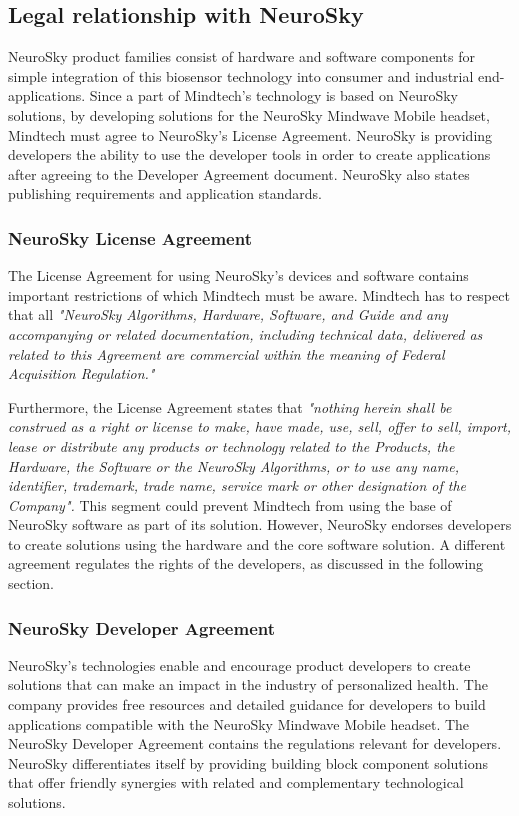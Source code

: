 \documentclass[letterpaper,10pt]{article}
\let\oldsubsection\subsection
\renewcommand{\subsection}{\def\cursectioning{subsection}\oldsubsection}
\begin{document}
\subsection{Legal relationship with NeuroSky}
NeuroSky product families consist of hardware and software components for simple integration of this biosensor technology into consumer and industrial end-applications.
Since a part of Mindtech's technology is based on NeuroSky solutions, by developing solutions for the NeuroSky Mindwave Mobile headset, Mindtech must agree to NeuroSky's License Agreement. NeuroSky is providing developers the ability to use the developer tools in order to create applications after agreeing to the Developer Agreement document. NeuroSky also states publishing requirements and application standards.

\subsubsection{NeuroSky License Agreement}

The License Agreement for using NeuroSky’s devices and software contains important restrictions of which Mindtech must be aware. Mindtech has to respect that all \textit{"NeuroSky Algorithms, Hardware, Software, and Guide and any accompanying or related documentation, including technical data, delivered as related to this Agreement are commercial within the meaning of Federal Acquisition Regulation."}

Furthermore, the License Agreement states that \textit{"nothing herein shall be construed as a right or license to make, have made, use, sell, offer to sell, import, lease or distribute any products or technology related to the Products, the Hardware, the Software or the NeuroSky Algorithms, or to use any name, identifier, trademark, trade name, service mark or other designation of the Company".} This segment could prevent Mindtech from using the base of NeuroSky software as part of its solution. However, NeuroSky endorses developers to create solutions using the hardware and the core software solution. A different agreement regulates the rights of the developers, as discussed in the following section.  \cite{neuro_licence_agreement}

\subsubsection{NeuroSky Developer Agreement}


NeuroSky’s technologies enable and encourage product developers to create solutions that can make an impact in the industry of personalized health. The company provides free resources and detailed guidance for developers to build applications compatible with the NeuroSky Mindwave Mobile headset. The NeuroSky Developer Agreement contains the regulations relevant for developers. NeuroSky differentiates itself by providing building block component solutions that offer friendly synergies with related and complementary technological solutions.
\end{document}
